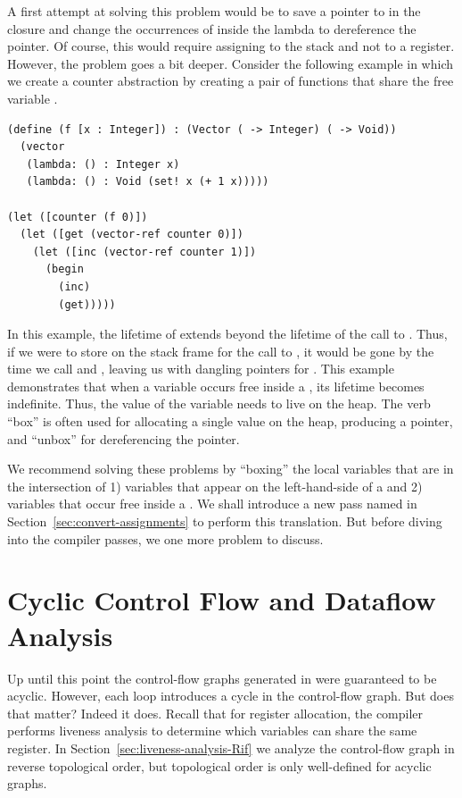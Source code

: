 \documentclass[11pt]{book}
\begin{document}
A first attempt at solving this problem would be to save a pointer to
 in the closure and change the occurrences of  inside
the lambda to dereference the pointer. Of course, this would require
assigning  to the stack and not to a register. However, the
problem goes a bit deeper. Consider the following example in which we
create a counter abstraction by creating a pair of functions that
share the free variable .
\begin{lstlisting}
(define (f [x : Integer]) : (Vector ( -> Integer) ( -> Void))
  (vector
   (lambda: () : Integer x)
   (lambda: () : Void (set! x (+ 1 x)))))

(let ([counter (f 0)])
  (let ([get (vector-ref counter 0)])
    (let ([inc (vector-ref counter 1)])
      (begin
        (inc)
        (get)))))
\end{lstlisting}
In this example, the lifetime of  extends beyond the lifetime
of the call to . Thus, if we were to store  on the
stack frame for the call to , it would be gone by the time we
call  and , leaving us with dangling pointers for
. This example demonstrates that when a variable occurs free
inside a , its lifetime becomes indefinite. Thus, the
value of the variable needs to live on the heap.  The verb ``box'' is
often used for allocating a single value on the heap, producing a
pointer, and ``unbox'' for dereferencing the pointer.

We recommend solving these problems by ``boxing'' the local variables
that are in the intersection of 1) variables that appear on the
left-hand-side of a  and 2) variables that occur free
inside a . We shall introduce a new pass named
 in Section~\ref{sec:convert-assignments} to
perform this translation. But before diving into the compiler passes,
we one more problem to discuss.

\section{Cyclic Control Flow and Dataflow Analysis}
\label{sec:dataflow-analysis}

Up until this point the control-flow graphs generated in
 were guaranteed to be acyclic. However, each
 loop introduces a cycle in the control-flow graph.
But does that matter?
%
Indeed it does.  Recall that for register allocation, the compiler
performs liveness analysis to determine which variables can share the
same register.  In Section~\ref{sec:liveness-analysis-Rif} we analyze
the control-flow graph in reverse topological order, but topological
order is only well-defined for acyclic graphs.
\end{document}
